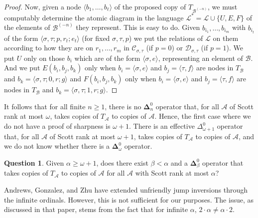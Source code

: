 \documentclass[10pt,a4paper]{article}
\newcommand{\Inv}[2]{{#2}^{(-#1)}}
\newcommand{\bfDelta}{\boldsymbol{\Delta}}
\theoremstyle{definition}
\newtheorem{question}[thm]{Question}
\begin{document}
\begin{proof}
		Now, given a node $\langle b_1,\ldots,b_\ell \rangle$ of the proposed copy of $T_{\Inv{n}{\mathcal{B}}}$, we must computably determine the atomic diagram in the language $\mathcal{L}^* = \mathcal{L} \cup \{ U,E,F\}$ of the elements of ${\Inv{n}{\mathcal{B}}}$ they represent. This is easy to do. Given $b_{i_1},\ldots,b_{i_m}$ with $b_{i_t}$ of the form $\langle \sigma,\tau; p, r_t ; e_t \rangle$ (for fixed $\sigma,\tau,p$) we put the relations of $\mathcal{L}$ on them according to how they are on $r_1,\ldots,r_m$ in $\mathcal{C}_{\sigma,\tau}$ (if $p = 0$) or $\mathcal{D}_{\sigma,\tau}$ (if $p = 1$). We put $U$ only on those $b_i$ which are of the form $\langle \sigma, e \rangle$, representing an element of $\mathcal{B}$. And we put $E(b_i,b_j,b_k)$ only when $b_i = \langle \sigma, e \rangle$ and $b_j = \langle \tau, f \rangle$ are nodes in $T_{\mathcal{B}}$ and $b_k = \langle \sigma,\tau; 0,r ; g \rangle$ and $F(b_i,b_j,b_k)$ only when $b_i = \langle \sigma , e \rangle$ and $b_j = \langle \tau , f \rangle$ are nodes in $T_{\mathcal{B}}$ and $b_k = \langle \sigma,\tau;1,r; g  \rangle$.
	\end{proof}
	
	It follows that for all finite $n\geq 1$, there is no $\bfDelta^0_n$ operator that, for all $\mathcal{A}$ of Scott rank at most $\omega$, takes copies of $T_\mathcal{A}$ to copies of $\mathcal{A}$. Hence, the first case where we do not have a proof of sharpness is $\omega+1$. There is an effective $\Delta^0_{\omega+1}$ operator that, for all $\mathcal{A}$ of Scott rank at most $\omega+1$, takes copies of $T_\mathcal{A}$ to copies of $\mathcal{A}$, and we do not know whether there is a $\bfDelta^0_\omega$ operator. %
	
	\begin{question}
		Given $\alpha\geq\omega+1$, does there exist $\beta < \alpha$ and a $\bfDelta^0_\beta$ operator that takes copies of $T_\mathcal{A}$ to copies of $\mathcal{A}$ for all $\mathcal{A}$ with Scott rank at most $\alpha$?
	\end{question}
	
	Andrews, Gonzalez, and Zhu \cite{belligerent} have extended unfriendly jump inversions through the infinite ordinals. However, this is not sufficient for our purposes. The issue, as discussed in that paper, stems from the fact that for infinite $\alpha$, $2 \cdot \alpha \neq \alpha \cdot 2$.
	



\end{document}
